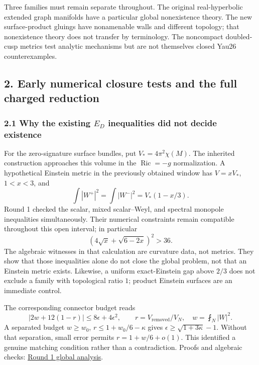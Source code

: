 \documentclass[
  english,
]{article}
\begin{document}
Three families must remain separate throughout. The original
real-hyperbolic extended graph manifolds have a particular global
nonexistence theory. The new surface-product gluings have nonamenable
walls and different topology; that nonexistence theory does not transfer
by terminology. The noncompact doubled-cusp metrics test analytic
mechanisms but are not themselves closed Yau26 counterexamples.

\hypertarget{early-numerical-closure-tests-and-the-full-charged-reduction}{%
\subsection{2. Early numerical closure tests and the full charged
reduction}\label{early-numerical-closure-tests-and-the-full-charged-reduction}}

\hypertarget{why-the-existing-e_d-inequalities-did-not-decide-existence}{%
\subsubsection{\texorpdfstring{2.1 Why the existing \(E_D\) inequalities
did not decide
existence}{2.1 Why the existing E\_D inequalities did not decide existence}}\label{why-the-existing-e_d-inequalities-did-not-decide-existence}}

For the zero-signature surface bundles, put \(V_*=4\pi^2\chi(M)\). The
inherited construction approaches this volume in the
\(\operatorname{Ric}=-g\) normalization. A hypothetical Einstein metric
in the previously obtained window has \(V=xV_*\), \(1<x<3\), and \[
 \int|W^+|^2=\int|W^-|^2=V_*(1-x/3).
\] Round 1 checked the scalar, mixed scalar--Weyl, and spectral monopole
inequalities simultaneously. Their numerical constraints remain
compatible throughout this open interval; in particular \[
 (4\sqrt{x}+\sqrt{6-2x})^2>36.
\] The algebraic witnesses in that calculation are curvature data, not
metrics. They show that those inequalities alone do not close the global
problem, not that an Einstein metric exists. Likewise, a uniform
exact-Einstein gap above \(2/3\) does not exclude a family with
topological ratio \(1\); product Einstein surfaces are an immediate
control.

The corresponding connector budget reads \[
 |2w+12(1-r)|\le 8\epsilon+4\epsilon^2,
 \qquad r=V_{\mathrm{removed}}/V_N,\quad w=\fint_N|W|^2.
\] A separated budget \(w\ge w_0\), \(r\le1+w_0/6-\kappa\) gives
\(\epsilon\ge\sqrt{1+3\kappa}-1\). Without that separation, small error
permits \(r=1+w/6+o(1)\). This identified a genuine matching condition
rather than a contradiction. Proofs and algebraic checks:
\href{../proofs/global.md}{Round 1 global analysis}.
\end{document}
